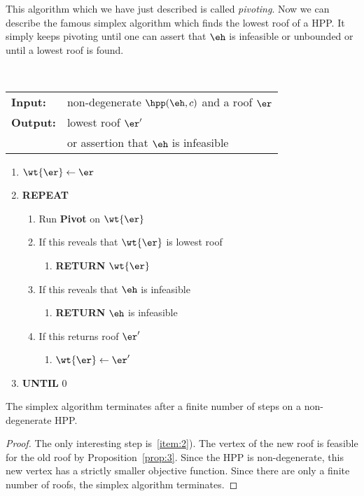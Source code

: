 This algorithm which we have just described is called
\emph{pivoting}. 
Now we can describe the famous simplex algorithm which finds the
lowest roof of a HPP. It simply keeps pivoting until one can
assert  that  $\eh$ is infeasible or unbounded or until a lowest
roof is found. 

\begin{algorithm}[Simplex]~\\
  \begin{tabular}{ll}
    {\bf Input:}  & non-degenerate $\hpp(\eh,c)$ and a roof $\er$\\
    {\bf Output:} & lowest roof $\er'$ \\
    & or assertion that $\eh$ is infeasible 
  \end{tabular}
  
  \begin{enumerate}
  \item $\wt{\er} \gets \er$
  \item {\bf REPEAT}
    \begin{enumerate}
    \item Run {\bf Pivot} on $\wt{\er}$
    \item If this reveals that $\wt{\er}$ is lowest roof
      \begin{enumerate}
      \item {\bf RETURN} $\wt{\er}$
      \end{enumerate}
    \item If this reveals that $\eh$ is infeasible
      \begin{enumerate}
      \item {\bf RETURN} $\eh$ is infeasible
      \end{enumerate}
    \item If this returns roof $\er'$ \label{item:2}
      \begin{enumerate}
      \item  $\wt{\er} \gets \er'$
      \end{enumerate}
    \end{enumerate}
    \item {\bf UNTIL} 0
  \end{enumerate}
\end{algorithm}


\begin{theorem}
  \label{thr:4}
  The simplex algorithm terminates after a finite number of steps on a
  non-degenerate HPP. 
\end{theorem}

\begin{proof}
  The only interesting step is~\ref{item:2}). The vertex of the new
  roof is feasible for the old roof by
  Proposition~\ref{prop:3}. Since the HPP is non-degenerate, this new
  vertex has a strictly smaller objective function. Since there are
  only a finite number of roofs, the simplex algorithm terminates. 
\end{proof}

